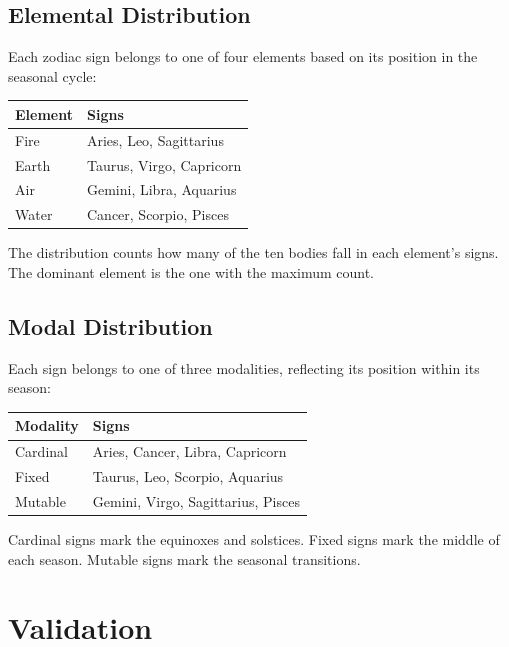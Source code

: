 \documentclass[11pt,letterpaper,twocolumn]{article}
\begin{document}
\subsection{Elemental Distribution}

Each zodiac sign belongs to one of four elements based on its position in the seasonal cycle:

\begin{center}
\begin{tabular}{ll}
\toprule
\textbf{Element} & \textbf{Signs} \\
\midrule
Fire  & Aries, Leo, Sagittarius \\
Earth & Taurus, Virgo, Capricorn \\
Air   & Gemini, Libra, Aquarius \\
Water & Cancer, Scorpio, Pisces \\
\bottomrule
\end{tabular}
\end{center}

The distribution counts how many of the ten bodies fall in each element's signs. The dominant element is the one with the maximum count.

\subsection{Modal Distribution}

Each sign belongs to one of three modalities, reflecting its position within its season:

\begin{center}
\begin{tabular}{ll}
\toprule
\textbf{Modality} & \textbf{Signs} \\
\midrule
Cardinal & Aries, Cancer, Libra, Capricorn \\
Fixed    & Taurus, Leo, Scorpio, Aquarius \\
Mutable  & Gemini, Virgo, Sagittarius, Pisces \\
\bottomrule
\end{tabular}
\end{center}

Cardinal signs mark the equinoxes and solstices. Fixed signs mark the middle of each season. Mutable signs mark the seasonal transitions.

\section{Validation}\label{sec:validation}
\end{document}
